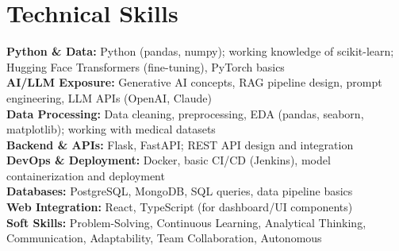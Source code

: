 \documentclass[10pt,a4paper]{article}
\begin{document}
\section*{Technical Skills}
{\small
\textbf{Python \& Data:} Python (pandas, numpy); working knowledge of scikit-learn; Hugging Face Transformers (fine-tuning), PyTorch basics\\[2pt]
\textbf{AI/LLM Exposure:} Generative AI concepts, RAG pipeline design, prompt engineering, LLM APIs (OpenAI, Claude)\\[2pt]
\textbf{Data Processing:} Data cleaning, preprocessing, EDA (pandas, seaborn, matplotlib); working with medical datasets\\[2pt]
\textbf{Backend \& APIs:} Flask, FastAPI; REST API design and integration\\[2pt]
\textbf{DevOps \& Deployment:} Docker, basic CI/CD (Jenkins), model containerization and deployment\\[2pt]
\textbf{Databases:} PostgreSQL, MongoDB, SQL queries, data pipeline basics\\[2pt]
\textbf{Web Integration:} React, TypeScript (for dashboard/UI components)\\[2pt]
\textbf{Soft Skills:} Problem-Solving, Continuous Learning, Analytical Thinking, Communication, Adaptability, Team Collaboration, Autonomous
}

\vspace{6pt}

\end{document}

